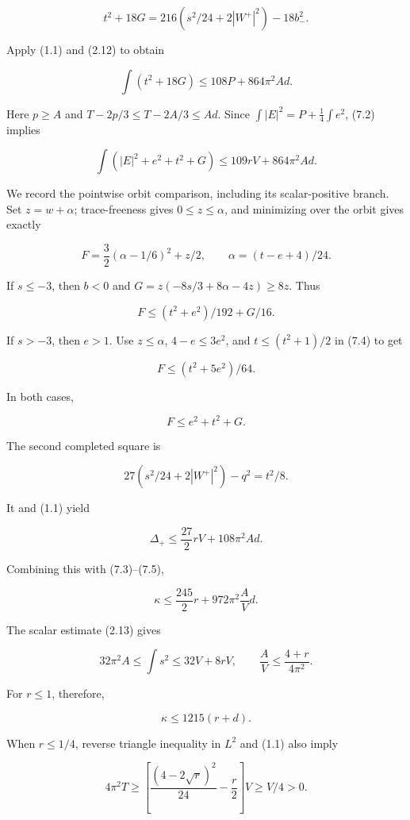 \documentclass[
  11pt,
]{article}
\begin{document}
\[
 t^2+18G=216\left(s^2/24+2|W^+|^2\right)-18b_-^2.
\]

Apply (1.1) and (2.12) to obtain

\[
                    \int(t^2+18G)\le108P+864\pi^2Ad.
 \tag{7.2}
\]

Here \(p\ge A\) and \(T-2p/3\le T-2A/3\le Ad\). Since
\(\int|E|^2=P+\frac14\int e^2\), (7.2) implies

\[
             \int(|E|^2+e^2+t^2+G)\le109rV+864\pi^2Ad.
 \tag{7.3}
\]

We record the pointwise orbit comparison, including its scalar-positive
branch. Set \(z=w+\alpha\); trace-freeness gives \(0\le z\le\alpha\),
and minimizing over the orbit gives exactly

\[
 F=\frac32(\alpha-1/6)^2+z/2,\qquad
                         \alpha=(t-e+4)/24.              \tag{7.4}
\]

If \(s\le-3\), then \(b<0\) and \(G=z(-8s/3+8\alpha-4z)\ge8z\). Thus

\[
                       F\le(t^2+e^2)/192+G/16.
\]

If \(s>-3\), then \(e>1\). Use \(z\le\alpha\), \(4-e\le3e^2\), and
\(t\le(t^2+1)/2\) in (7.4) to get

\[
                       F\le(t^2+5e^2)/64.
\]

In both cases,

\[
                             F\le e^2+t^2+G.             \tag{7.5}
\]

The second completed square is

\[
 27\left(s^2/24+2|W^+|^2\right)-q^2=t^2/8.
\]

It and (1.1) yield

\[
 \Delta_+\le\frac{27}{2}rV+108\pi^2Ad.
\]

Combining this with (7.3)--(7.5),

\[
                     \kappa\le\frac{245}{2}r
                                      +972\pi^2\frac AVd.
 \tag{7.6}
\]

The scalar estimate (2.13) gives

\[
 32\pi^2A\le\int s^2\le32V+8rV,
              \qquad \frac AV\le\frac{4+r}{4\pi^2}.
 \tag{7.7}
\]

For \(r\le1\), therefore,

\[
                              \kappa\le1215(r+d).        \tag{7.8}
\]

When \(r\le1/4\), reverse triangle inequality in \(L^2\) and (1.1) also
imply

\[
 4\pi^2T
     \ge\left[\frac{(4-2\sqrt r)^2}{24}-\frac r2\right]V
     \ge V/4>0.                                          \tag{7.9}
\]
\end{document}
